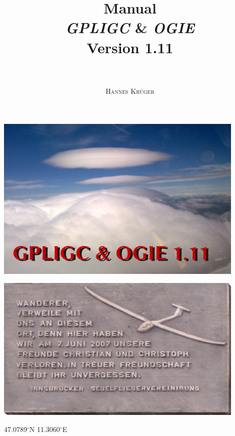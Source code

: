 \documentclass[a4paper,10pt]{article}
\title{
{\huge \textbf{Manual}}\\
\emph{GPLIGC} \& \emph{OGIE}\\
{\small Version 1.11}\\
~\\
}
\author{\textsc{Hannes Kr\"uger}}
\begin{document}
\maketitle
\begin{center}
\includegraphics[width=12cm]{jpg/logo}
\end{center}

\newpage

\thispagestyle{empty}
\begin{center}
\includegraphics[width=12cm]{png/CC}
\end{center}
47.0789$^\circ$N 11.3060$^\circ$E

\newpage
\tableofcontents
\sloppy





%       
%       
%       






\begin{appendix}






%



\end{appendix}




\end{document}
